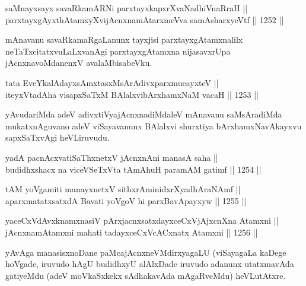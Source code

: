 
\begin{shl}
saMnayxsayx savaRkamARNi parxtayxkapxrXvaNadhiVnaRraH || \\
parxtayxgAyxthAtamxyXvijAcnxnamAtarxmeVva samAsharxyeVtf \hfill || 1252 ||  
\end{shl}

\begin{artha}
mAnavanu savaRkamaRgaLanunx tayxjisi parxtayxgAtamxnalilx neTaTxcitatxvuLaLxvanAgi parxtayxgAtamxna nijasavxrUpa jAcnxnavoMdanenxV avalaMbisabeVku.
\end{artha}

\begin{shl}
tata EveYkalAdayxsAmxtasxMsArAdivxparxmucayxteV || \\
iteyxVtadAha visapxSaTxM BAlalxvibArxhamxNaM vacaH \hfill || 1253 ||  
\end{shl}

\begin{artha}
yAvudariMda adeV adivxtiVyajAcnxnadiMdaleV mAnavanu saMsAradiMda mukatxnAguvano adeV viSayavanunx BAlalxvi shurxtiya bArxhamxNavAkayxvu sapxSaTxvAgi heVLiruvudu.
\end{artha}


\begin{shl}
yadA pacnAcxvatiSaThxnetxV jAcnxnAni manasA saha || \\
budidhxshacx na viceVSeTxVta tAmAhuH paramAM gatimf \hfill || 1254 ||  
\end{shl}
				
\begin{shl}
tAM yoVgamiti manayxnetxV sithxrAminidxrXyadhAraNAmf || \\
aparxmatatxsatxdA Bavati yoVgoV hi parxBavApayxyw \hfill || 1255 ||  
\end{shl}

\begin{shl}
yaceCxVdAvxknamxnasiV pArxjacnxsatxdayxceCxVjAjxcnXna Atamxni || \\
jAcnxnamAtamxni mahati tadayxceCxVcACxnatx Atamxni \hfill || 1256 ||  
\end{shl}

\begin{artha}
yAvAga manasisxnoDane paMcajAcnxneVMdirxyagaLU (viSayagaLa kaDege hoVgade, iruvudo hAgU budidhxyU alAlxDade iruvudo adanunx utatxmavAda gatiyeMdu (adeV moVkaSxkekx sAdhakavAda mAgaRveMdu) heVLutAtxre.
\end{artha}

